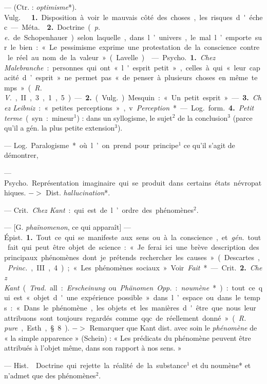 \begin{itemize}[leftmargin=1cm, label=, itemsep=1pt]
 — (Ctr. : {\it optimisme}*). \si{Vulg.} 
 {\bf 1.} Disposition à voir le mauvais côté des choses, les
risques d'échec. — \si{Méta.}  {\bf 2.} Doctrine ({\it p. e.}
de Schopenhauer) selon laquelle, dans l’univers, le mal l’emporte sur le
bien : « Le pessimisme exprime une protestation de la conscience contre le
réel au nom de la valeur » (Lavelle).

 — \si{Psycho.} {\bf 1.} {\it Chez Malebranche} : personnes qui ont
« l'esprit petit », celles à qui « leur capacité d’esprit » ne permet pas «
de penser à plusieurs choses en même temps » ({\it R. V.}, II, 3, 1, 5). —
{\bf 2.} (\si{Vulg.}) Mesquin : « Un petit esprit ». — {\bf 3.} {\it Chez
Leibniz} : « petites perceptions », v. {\it Perception}*.

— \si{Log.} \si{form.} {\bf 4.} {\it Petit terme} (syn. :
mineur$^1$) : dans un syllogisme, le
sujet$^2$ de la conclusion$^3$ (parce qu’il
a gén. la plus petite extension$^3$).

 — \si{Log.} Paralogisme* où l’on prend pour
principe$^1$ ce qu'il s’agit de démontrer,

 — \si{Psycho.} Représentation imaginaire qui se produit dans
certains états névropathiques. $->$ Dist. {\it hallucination}*.

 — \si{Crit.} {\it Chez Kant} : qui
est de l’ordre des phénomènes$^2$.

 — [G. {\it phaïnomenon}, ce qui apparaît] — \si{Épist.}
{\bf 1.} Tout ce qui se manifeste aux sens ou à la conscience, et {\it gén.}
tout fait qui peut être objet de science : « Je ferai ici une brève
description des principaux phénomènes dont je prétends rechercher les causes
» (Descartes, {\it Princ.}, III, 4) ; « Les phénomènes sociaux ». Voir
{\it Fait}*.

— \si{Crit.} {\bf 2.} {\it Chez Kant} ({\it Trad.} all. : {\it Erscheinung}
ou {\it Phänomen}. {\it Opp.} : {\it noumène}*) : tout ce qui est « objet
d'une expérience possible » dans l’espace ou dans le temps : « Dans le
phénomène, les objets et les manières d'être que nous leur attribuons sont
toujours regardés comme qqc. de réellement donné » ({\it R. pure}, Esth., §
8). $->$ Remarquer que Kant dist. avec soin le {\it phénomène} de « la simple
apparence » (Schein) : « Les prédicats du phénomène peuvent être attribués à
l’objet même, dans son rapport à nos sens. »

 — \si{Hist.}  Doctrine qui rejette la
réalité de la substance$^1$ et du noumène* et n’admet que des phénomènes$^2$.


\end{itemize}
